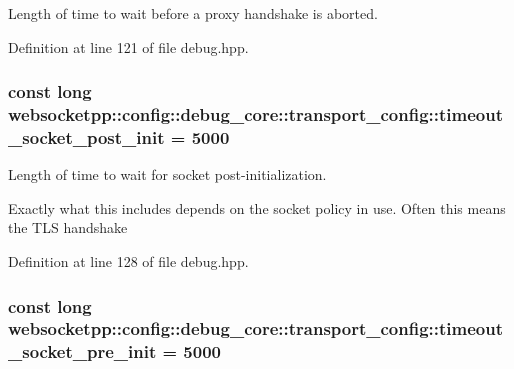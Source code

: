 Length of time to wait before a proxy handshake is aborted. 



Definition at line 121 of file debug.\+hpp.

\hypertarget{structwebsocketpp_1_1config_1_1debug__core_1_1transport__config_ad2a5a0b0dcc45899356e0ba7df49860d}{}
\subsubsection[{timeout\+\_\+socket\+\_\+post\+\_\+init}]{\setlength{\rightskip}{0pt plus 5cm}const long websocketpp\+::config\+::debug\+\_\+core\+::transport\+\_\+config\+::timeout\+\_\+socket\+\_\+post\+\_\+init = 5000\hspace{0.3cm}{\ttfamily [static]}}\label{structwebsocketpp_1_1config_1_1debug__core_1_1transport__config_ad2a5a0b0dcc45899356e0ba7df49860d}


Length of time to wait for socket post-\/initialization. 

Exactly what this includes depends on the socket policy in use. Often this means the T\+L\+S handshake 

Definition at line 128 of file debug.\+hpp.

\hypertarget{structwebsocketpp_1_1config_1_1debug__core_1_1transport__config_a4935338debd7b6e1434a471c94d8abda}{}
\subsubsection[{timeout\+\_\+socket\+\_\+pre\+\_\+init}]{\setlength{\rightskip}{0pt plus 5cm}const long websocketpp\+::config\+::debug\+\_\+core\+::transport\+\_\+config\+::timeout\+\_\+socket\+\_\+pre\+\_\+init = 5000\hspace{0.3cm}{\ttfamily [static]}}\label{structwebsocketpp_1_1config_1_1debug__core_1_1transport__config_a4935338debd7b6e1434a471c94d8abda}


